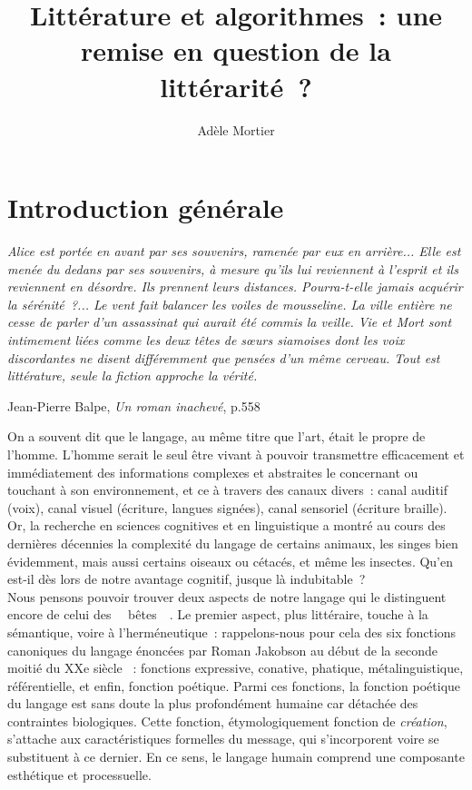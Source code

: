 \documentclass{article}
\title{Littérature et algorithmes~: une remise en question de la littérarité~?}
\author{Adèle Mortier}
\begin{document}
	\nocite{*}
	\maketitle
	\tableofcontents
	\newpage
	\section*{Introduction générale}
	\begin{center}
		\begin{minipage}{.8\textwidth}
			\textit{Alice est portée en avant par ses souvenirs, ramenée par eux en arrière... Elle est menée du dedans par ses souvenirs, à mesure qu'ils lui reviennent à l'esprit et ils reviennent en désordre. Ils prennent leurs distances. Pourra-t-elle jamais acquérir la sérénité~?... Le vent fait balancer les voiles de mousseline. La ville entière ne cesse de parler d'un assassinat qui aurait été commis la veille. Vie et Mort sont intimement liées comme les deux têtes de sœurs siamoises dont les voix discordantes ne disent différemment que pensées d'un même cerveau. Tout est littérature, seule la fiction approche la vérité.}
			\begin{flushright}
				Jean-Pierre Balpe, \textit{Un roman inachevé}, p.558 \autocite{balpe1994}
			\end{flushright}
		\end{minipage}
	\end{center}
	
		On a souvent dit que le langage, au même titre que l'art, était le propre de l'homme. L'homme serait le seul être vivant à pouvoir transmettre efficacement et immédiatement des informations complexes et abstraites le concernant ou touchant à son environnement, et ce à travers des canaux divers~: canal auditif (voix), canal visuel (écriture, langues signées), canal sensoriel (écriture braille). Or, la recherche en sciences cognitives et  en linguistique a montré au cours des dernières décennies la complexité du langage de certains animaux, les singes bien évidemment\autocite{schlenker2014}, mais aussi certains oiseaux ou cétacés\autocite{dehaene2017}, et même les insectes. Qu'en est-il dès lors de notre avantage cognitif, jusque là indubitable~?\\
		
		Nous pensons pouvoir trouver deux aspects de notre langage qui le distinguent encore de celui des \guillemotleft~ bêtes ~\guillemotright. Le premier aspect, plus littéraire, touche à la sémantique, voire à l'herméneutique~: rappelons-nous pour cela des six fonctions canoniques du langage énoncées par Roman Jakobson au début de la seconde moitié du XXe siècle \autocite{jakobson1960}~: fonctions expressive, conative, phatique, métalinguistique, référentielle, et enfin, fonction poétique. Parmi ces fonctions, la fonction poétique du langage est sans doute la plus profondément humaine car détachée des contraintes biologiques. Cette fonction, étymologiquement fonction de \textit{création}, s'attache aux caractéristiques formelles du message, qui s'incorporent voire se substituent à ce dernier. En ce sens, le langage humain comprend une composante esthétique et processuelle.\\
		
\end{document}
